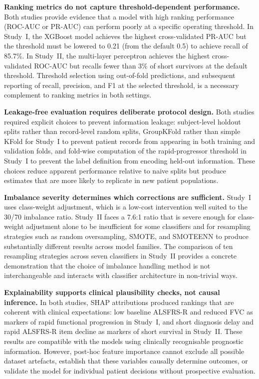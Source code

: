 \textbf{Ranking metrics do not capture threshold-dependent performance.} Both studies provide evidence that a model with high ranking performance (\gls{ROC-AUC} or \gls{PR-AUC}) can perform poorly at a specific operating threshold. In Study~I, the XGBoost model achieves the highest cross-validated \gls{PR-AUC} but the threshold must be lowered to 0.21 (from the default 0.5) to achieve recall of 85.7\%. In Study~II, the multi-layer perceptron achieves the highest cross-validated \gls{ROC-AUC} but recalls fewer than 3\% of short survivors at the default threshold. Threshold selection using out-of-fold predictions, and subsequent reporting of recall, precision, and F1 at the selected threshold, is a necessary complement to ranking metrics in both settings.

\textbf{Leakage-free evaluation requires deliberate protocol design.} Both studies required explicit choices to prevent information leakage: subject-level holdout splits rather than record-level random splits, GroupKFold rather than simple KFold for Study~I to prevent patient records from appearing in both training and validation folds, and fold-wise computation of the rapid-progressor threshold in Study~I to prevent the label definition from encoding held-out information. These choices reduce apparent performance relative to naive splits but produce estimates that are more likely to replicate in new patient populations.

\textbf{Imbalance severity determines which corrections are sufficient.} Study~I uses class-weight adjustment, which is a low-cost intervention well suited to the 30/70 imbalance ratio. Study~II faces a 7.6:1 ratio that is severe enough for class-weight adjustment alone to be insufficient for some classifiers and for resampling strategies such as random oversampling, SMOTE, and SMOTEENN to produce substantially different results across model families. The comparison of ten resampling strategies across seven classifiers in Study~II provides a concrete demonstration that the choice of imbalance handling method is not interchangeable and interacts with classifier architecture in non-trivial ways.

\textbf{Explainability supports clinical plausibility checks, not causal inference.} In both studies, \gls{SHAP} attributions produced rankings that are coherent with clinical expectations: low baseline \gls{ALSFRS-R} and reduced \gls{FVC} as markers of rapid functional progression in Study~I, and short diagnosis delay and rapid \gls{ALSFRS-R} item decline as markers of short survival in Study~II. These results are compatible with the models using clinically recognisable prognostic information. However, post-hoc feature importance cannot exclude all possible dataset artefacts, establish that these variables causally determine outcomes, or validate the model for individual patient decisions without prospective evaluation.

